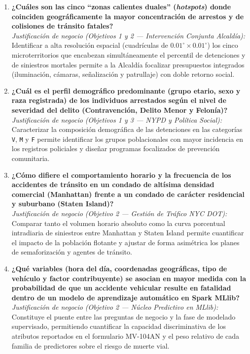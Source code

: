 \documentclass[11pt,a4paper]{article}
\begin{document}
\begin{enumerate}
    \item \textbf{¿Cuáles son las cinco ``zonas calientes duales'' (\textit{hotspots}) donde coinciden geográficamente la mayor concentración de arrestos y de colisiones de tránsito fatales?}\\
    \textit{Justificación de negocio (Objetivos 1 y 2 --- Intervención Conjunta Alcaldía):} Identificar a alta resolución espacial (cuadrículas de $0.01^\circ \times 0.01^\circ$) los cinco microterritorios que encabezan simultáneamente el percentil de detenciones y de siniestros mortales permite a la Alcaldía focalizar presupuestos integrados (iluminación, cámaras, señalización y patrullaje) con doble retorno social.

    \item \textbf{¿Cuál es el perfil demográfico predominante (grupo etario, sexo y raza registrada) de los individuos arrestados según el nivel de severidad del delito (Contravención, Delito Menor y Felonía)?}\\
    \textit{Justificación de negocio (Objetivos 1 y 3 --- NYPD y Política Social):} Caracterizar la composición demográfica de las detenciones en las categorías \texttt{V}, \texttt{M} y \texttt{F} permite identificar los grupos poblacionales con mayor incidencia en los registros policiales y diseñar programas focalizados de prevención comunitaria.

    \item \textbf{¿Cómo difiere el comportamiento horario y la frecuencia de los accidentes de tránsito en un condado de altísima densidad comercial (Manhattan) frente a un condado de carácter residencial y suburbano (Staten Island)?}\\
    \textit{Justificación de negocio (Objetivo 2 --- Gestión de Tráfico NYC DOT):} Comparar tanto el volumen horario absoluto como la curva porcentual intradiaria de siniestros entre Manhattan y Staten Island permite cuantificar el impacto de la población flotante y ajustar de forma asimétrica los planes de semaforización y agentes de tránsito.

    \item \textbf{¿Qué variables (hora del día, coordenadas geográficas, tipo de vehículo y factor contribuyente) se asocian en mayor medida con la probabilidad de que un accidente vehicular resulte en fatalidad dentro de un modelo de aprendizaje automático en Spark MLlib?}\\
    \textit{Justificación de negocio (Objetivo 2 --- Núcleo Predictivo en MLlib):} Constituye el puente entre las preguntas de negocio y la fase de modelado supervisado, permitiendo cuantificar la capacidad discriminativa de los atributos reportados en el formulario MV-104AN y el peso relativo de cada familia de predictores sobre el riesgo de muerte vial.

\end{enumerate}
\end{document}
